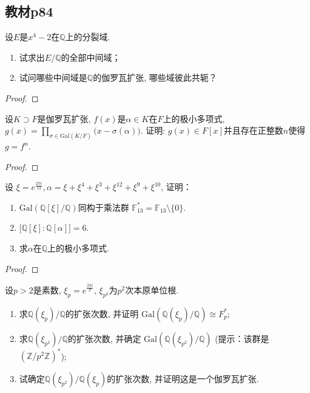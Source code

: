\subsection{教材p84}

\begin{problem}
    设$E$是$x^4-2$在$\mathbb{Q}$上的分裂域.
\begin{enumerate}[(1)]
    \item 试求出$E/\mathbb{Q}$的全部中间域；
    \item 试问哪些中间域是$\mathbb{Q}$的伽罗瓦扩张, 哪些域彼此共轭？
\end{enumerate}
\end{problem}

\begin{proof}
    
\end{proof}

\begin{problem}
    设$K \supset F$是伽罗瓦扩张, $f(x)$是$\alpha \in K$在$F$上的极小多项式, 
\(
    g(x) = \prod_{\sigma \in \mathrm{Gal}(K/F)} \big(x - \sigma(\alpha) \big).
\)
证明: $g(x) \in F[x]$并且存在正整数$n$使得$g = f^n$.
\end{problem}

\begin{proof}
    
\end{proof}

\begin{problem}
    设
$\xi = e^{\frac{2\pi i}{13}}, \alpha = \xi + \xi^4 + \xi^3 + \xi^{12} + \xi^9 + \xi^{10}$,
证明：
\begin{enumerate}[(1)]
    \item $\mathrm{Gal}\left(\mathbb{Q}[\xi]/\mathbb{Q}\right)$同构于乘法群
$\mathbb{F}_{13}^* = \mathbb{F}_{13} \setminus \{0\}$.
    \item $\bigl[\mathbb{Q}[\xi]:\mathbb{Q}[\alpha]\bigr] = 6$.
    \item 求$\alpha$在$\mathbb{Q}$上的极小多项式.
\end{enumerate}
\end{problem}

\begin{proof}
    
\end{proof}

\begin{problem}
    设$p > 2$是素数, $\xi_p = e^{\frac{2\pi i}p},\, \xi_{p^2}$为$p^2$次本原单位根. 
\begin{enumerate}[(1)]
    \item 求$\mathbb{Q}(\xi_p)/\mathbb{Q}$的扩张次数, 并证明
$\mathrm{Gal}(\mathbb{Q}(\xi_p)/\mathbb{Q}) \cong F_p^*$;
    \item 求$\mathbb{Q}(\xi_{p^2})/\mathbb{Q}$的扩张次数, 并确定
$\mathrm{Gal}(\mathbb{Q}(\xi_{p^2})/\mathbb{Q})$
(提示：该群是$(\mathbb{Z}/p^2\mathbb{Z})^*$);
    \item 试确定$\mathbb{Q}(\xi_{p^2})/\mathbb{Q}(\xi_p)$的扩张次数, 并证明这是一个伽罗瓦扩张.
\end{enumerate}
\end{problem}

